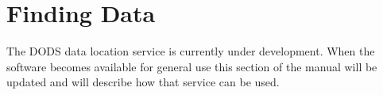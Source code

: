 

\chapter{Finding Data}

The DODS data location service is currently under development. When the
software becomes available for general use this section of the manual will be
updated and will describe how that service can be used.









